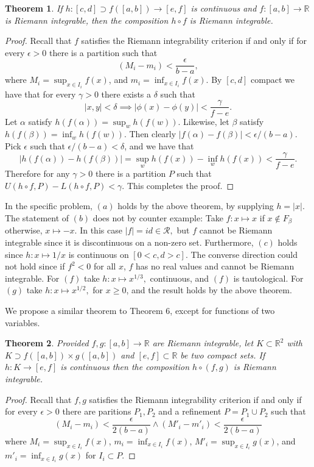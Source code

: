 \documentclass[letter]{article}
\newtheorem{theorem}{Theorem}
\newenvironment{menumerate}{%
  \edef\backupindent{\the\parindent}%
  \enumerate%
  \setlength{\parindent}{\backupindent}%
}{\endenumerate}
\begin{document}
\begin{menumerate}
	\begin{theorem}
	If $h: [c,d] \supset f([a,b]) \to [e,f]$ is continuous and $f:[a,b] \to \mathbb{R}$ is Riemann integrable, then the composition $h \circ f$ is Riemann integrable.
	\end{theorem}
	\begin{proof}
		Recall that $f$ satisfies the Riemann integrability criterion if and only if for every $\epsilon > 0$ there is a partition such that $$(M_i-m_i) < \frac{\epsilon}{b-a},$$ where $M_i = \sup_{x\in I_i} f(x)$, and $m_i = \inf_{x\in I_i} f(x).$ By $[c,d]$ compact we have that for every $\gamma > 0$ there exists a $\delta$ such that $$|x,y| < \delta \implies |\phi(x) - \phi(y)| < \frac{\gamma}{f-e}.$$ Let $\alpha$ satisfy $h(f(\alpha)) = \sup_w h(f(w)).$ Likewise, let $\beta$ satisfy $h(f(\beta)) = \inf_w h(f(w)).$ Then clearly $|f(\alpha) - f(\beta)| < \epsilon/(b-a).$ Pick $\epsilon$ such that $\epsilon/(b-a) < \delta$, and we have that $$|h(f(\alpha)) - h(f(\beta))| = \sup_w h(f(x)) - \inf_w h(f(x)) < \frac{\gamma}{f-e}.$$ Therefore for any $\gamma > 0$ there is a partition $P$ such that $U(h \circ f, P) - L (h \circ f, P) <\gamma.$ This completes the proof.
	\end{proof}

	In the specific problem, $(a)$ holds by the above  theorem, by supplying $h = |x|.$ The statement of $(b)$ does not by counter example: Take $f: x \mapsto x$ if $x \notin F_\beta$ otherwise, $x \mapsto -x.$ In this case $|f| = id \in \mathcal{R},$ but $f$ cannot be Riemann integrable since it is discontinuous on a non-zero set. Furthermore, $(c)$ holds since $h: x \mapsto 1/x$ is continuous on $[0<c,d>c].$ The converse direction could not hold since if $f^2 < 0$ for all $x$, $f$ has no real values and cannot be Riemann integrable. For $(f)$ take $h: x \mapsto x^{1/3},$ continuous, and $(f)$ is tautological. For $(g)$ take $h: x \mapsto x^{1/2},$ for $x \geq 0$, and the result holds by the above theorem. 

\item We propose a similar theorem to Theorem 6, except for functions of two variables.


	\begin{theorem} Provided $f,g:[a,b] \to \mathbb{R}$ are Riemann integrable, let $K \subset \mathbb{R}^2$ with $K \supset f([a,b]) \times g([a,b])$ and $[e,f] \subset \mathbb{R}$ be two compact sets.
	If $h: K \to [e,f]$ is continuous then the composition $h \circ (f,g)$ is Riemann integrable.
	\end{theorem}
	\begin{proof}
		Recall that $f,g$ satisfies the Riemann integrability criterion if and only if for every $\epsilon > 0$ there are paritions $P_1,P_2$ and a refinement $P = P_1 \cup P_2$ such that $$(M_i-m_i) < \frac{\epsilon}{2(b-a)} \wedge (M'_i-m'_i) < \frac{\epsilon}{2(b-a)}$$ where $M_i = \sup_{x\in I_i} f(x)$, $m_i = \inf_{x\in I_i} f(x)$, $M'_i = \sup_{x\in I_i} g(x)$, and $m'_i = \inf_{x\in I_i} g(x)$ for $I_i \subset P.$ 


\end{proof}
\end{menumerate}
\end{document}
